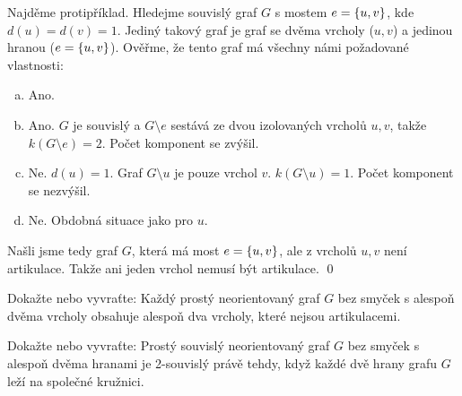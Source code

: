 \documentclass[11pt,a4paper]{article}
\begin{document}
\begin{solution}
Najděme protipříklad. Hledejme souvislý graf $G$ s mostem $e = \left\lbrace u,v \right\rbrace$, kde $d(u)=d(v)=1$. 
Jediný takový graf je graf se dvěma vrcholy ($u,v$) a jedinou hranou ($e=\left\lbrace u,v \right\rbrace$).
Ověřme, že tento graf má všechny námi požadované vlastnosti:
\begin{enumerate}[(a), noitemsep]
    \item {} Ano.
    \item {} Ano. $G$ je souvislý a $G \setminus e$ sestává ze dvou izolovaných vrcholů $u,v$, 
    takže $k(G \setminus e)=2$. Počet komponent se zvýšil.
    \item {} Ne. $d(u)=1$. Graf $G \setminus u$ je pouze vrchol $v$. $k(G \setminus u)=1$. Počet 
    komponent se nezvýšil.
    \item {} Ne. Obdobná situace jako pro $u$.
\end{enumerate}
Našli jsme tedy graf $G$, která má most $e = \left\lbrace u,v \right\rbrace$, ale  z vrcholů $u,v$ není artikulace. Takže ani 
jeden vrchol nemusí být artikulace.
\hspace{\fill}\qed
\end{solution}

\begin{exercise}
Dokažte nebo vyvraťte: Každý prostý neorientovaný graf $G$ bez smyček s alespoň dvěma vrcholy obsahuje alespoň dva 
vrcholy, které nejsou artikulacemi.
\end{exercise}
\begin{solution}

\end{solution}

\begin{exercise}
Dokažte nebo vyvraťte: Prostý souvislý neorientovaný graf $G$ bez smyček s alespoň dvěma hranami je 2-souvislý právě 
tehdy, když každé dvě hrany grafu $G$ leží na společné kružnici.
\end{exercise}
\begin{solution}

\end{solution}
\end{document}

